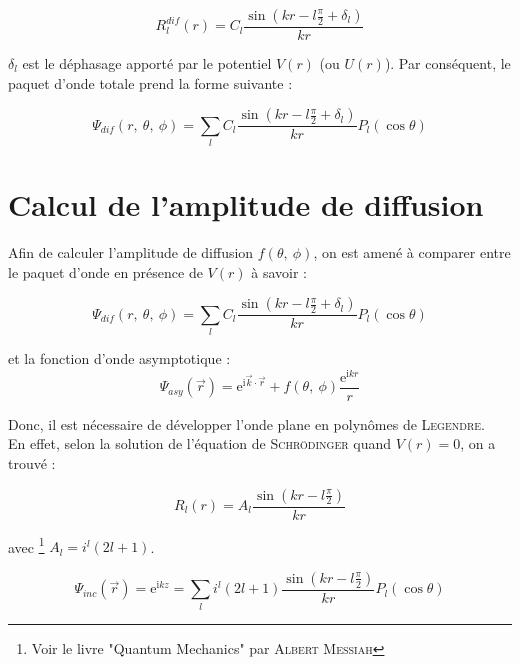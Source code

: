\documentclass[12pt,a4paper,oneside,french]{book}
\renewcommand{\i}{\mathrm{i}}
\newcommand{\e}{\mathrm{e}}
\theoremstyle{definition}
\theoremstyle{definition}
\theoremstyle{definition}
\theoremstyle{remark}
\theoremstyle{definition}
\begin{document}
    \begin{equation*}
        {R}_{l}^{dif}(r) = {C}_{l} \frac{\sin\left(k r - l \frac{\pi}{2} + {\delta}_{l}\right)}{k r}
    \end{equation*}
    
    ${\delta}_{l}$ est le déphasage apporté par le potentiel $V(r)$ (ou $U(r)$). Par conséquent, le paquet d'onde totale prend la forme suivante :
    
    \begin{equation*}
        {\Psi}_{dif}(r, \ \theta, \ \phi) = \sum_{l} {C}_{l} \frac{\sin\left(k r - l \frac{\pi}{2} + {\delta}_{l}\right)}{k r} {P}_{l}(\cos{\theta})
    \end{equation*}
    
    \section{Calcul de l'amplitude de diffusion}
    Afin de calculer l'amplitude de diffusion $f(\theta, \ \phi)$, on est amené à comparer entre le paquet d'onde en présence de $V(r)$ à savoir : 
    
    \begin{equation} \label{ch2eq/3}
        {\Psi}_{dif}(r, \ \theta, \ \phi) = \sum_{l} {C}_{l} \frac{\sin\left(k r - l \frac{\pi}{2} + {\delta}_{l}\right)}{k r} {P}_{l}(\cos{\theta})
    \end{equation}
    
    et la fonction d'onde asymptotique :
    \begin{equation} \label{ch2eq/4}
        {\Psi}_{asy}(\vec{r}) = {\e}^{\i \vec{k} \cdot \vec{r}} + f(\theta, \ \phi) \frac{{\e}^{\i k r}}{r}
    \end{equation}
    
    Donc, il est nécessaire de développer l'onde plane en polynômes de \textsc{Legendre}. \\
    
    En effet, selon la solution de l'équation de \textsc{Schrödinger} quand $V(r) = 0$, on a trouvé :
    
    \begin{equation*}
        {R}_{l}(r) = {A}_{l} \frac{\sin\left(k r - l \frac{\pi}{2}\right)}{k r}
    \end{equation*}
    
    avec \footnote{Voir le livre "Quantum Mechanics" par \textsc{Albert Messiah}} ${A}_{l} = {i}^{l} (2l + 1)$.
    
    \begin{equation*}
        {\Psi}_{inc}(\vec{r}) = {\e}^{\i k z} = \sum_{l} {i}^{l} (2l + 1) \frac{\sin\left(k r - l \frac{\pi}{2}\right)}{k r} {P}_{l}(\cos{\theta})
    \end{equation*}
    
\end{document}
